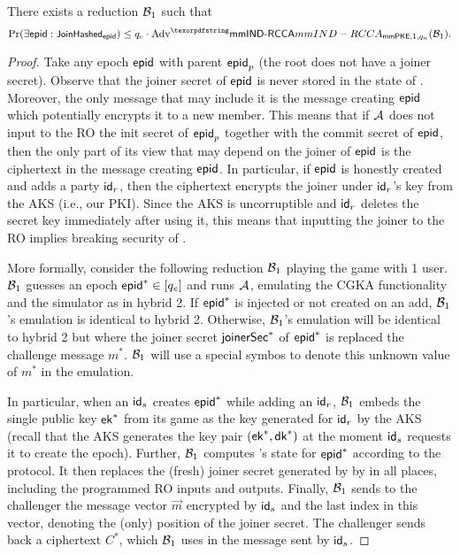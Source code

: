 \begin{lemma}
  There exists a reduction $\Bdv[1]$ such that
  \begin{equation*}
    \Pr(\exists \hgnodeid : \joinerHash_{\hgnodeid}) \leq q_e\cdot\textnormal{Adv}^\mmindrcca_{\mmPKE,1,q_n}(\Bdv[1]).
  \end{equation*}
\end{lemma}
\begin{proof}
  Take any epoch $\hgnodeid$ with parent $\hgnodeid_p$ (the root does not have a joiner secret). Observe that the joiner secret of $\hgnodeid$ is never stored in the state of \saik. Moreover, the only message that may include it is the message creating $\hgnodeid$ which potentially encrypts it to a new member. This means that if $\Adv$ does not input to the RO the init secret of $\hgnodeid_p$ together with the commit secret of $\hgnodeid$, then the only part of its view that may depend on the joiner of $\hgnodeid$ is the ciphertext in the message creating $\hgnodeid$. In particular, if $\hgnodeid$ is honestly created and adds a party $\id_r$, then the ciphertext encrypts the joiner under $\id_r$'s key from the AKS (i.e., our PKI). Since the AKS is uncorruptible and $\id_r$ deletes the secret key immediately after using it, this means that inputting the joiner to the RO implies breaking security of \mmPKE.

  More formally, consider the following reduction $\Bdv[1]$ playing the \mmowrcca game with 1 user. $\Bdv[1]$ guesses an epoch $\hgnodeid^* \in [q_e]$ and runs $\Adv$, emulating the CGKA functionality and the simulator as in hybrid 2. If $\hgnodeid^*$ is injected or not created on an add, $\Bdv[1]$'s emulation is identical to hybrid 2. Otherwise, $\Bdv[1]$'s emulation will be identical to hybrid 2 but where the joiner secret $\joinerSecret^*$ of $\hgnodeid^*$ is replaced the \mmowrcca challenge message $m^*$. $\Bdv[1]$ will use a special symbos  to denote this unknown value of $m^*$ in the emulation.

  In particular, when an $\id_s$ creates $\hgnodeid^*$ while adding an $\id_r$, $\Bdv[1]$ embeds the single public key $\mmpkepk^*$ from its game as the key generated for $\id_r$ by the AKS (recall that the AKS generates the key pair $(\mmpkepk^*,\mmpkesk^*)$ at the moment $\id_s$ requests it to create the epoch). Further, $\Bdv[1]$ computes \saik's state for $\hgnodeid^*$ according to the protocol. It then replaces the (fresh) joiner secret generated by \saik by  in all places, including the programmed RO inputs and outputs. Finally, $\Bdv[1]$ sends to the challenger the message vector $\vec m$ encrypted by $\id_s$ and the last index in this vector, denoting the (only) position of the joiner secret. The challenger sends back a ciphertext $C^*$, which $\Bdv[1]$ uses in the message sent by $\id_s$.


\end{proof}

